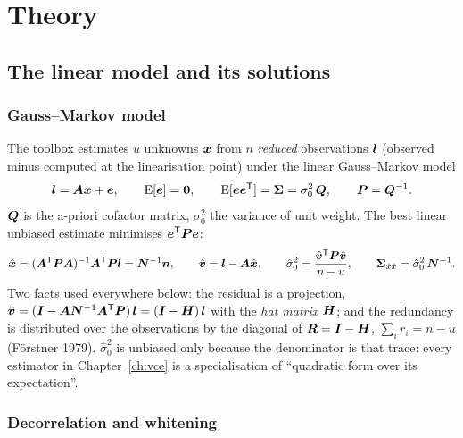 \part{Theory}

\chapter{The linear model and its solutions}
\label{ch:model}

\section{Gauss--Markov model}

The toolbox estimates $u$ unknowns $\bm{x}$ from $n$ \emph{reduced} observations $\bm{l}$ (observed minus computed at the linearisation point) under the linear Gauss--Markov model
\begin{equation}
\bm{l} = \bm{A}\bm{x} + \bm{e}, \qquad \operatorname{E}[\bm{e}] = \bm{0}, \qquad \operatorname{E}[\bm{e}\bm{e}^{\mathsf T}] = \bm{\Sigma} = \sigma_0^2\,\bm{Q}, \qquad \bm{P} = \bm{Q}^{-1}.
\label{eq:gm}
\end{equation}
$\bm{Q}$ is the a-priori cofactor matrix, $\sigma_0^2$ the variance of unit weight. The best linear unbiased estimate minimises $\bm{e}^{\mathsf T}\bm{P}\bm{e}$:
\begin{equation}
\hat{\bm{x}} = (\bm{A}^{\mathsf T}\bm{P}\bm{A})^{-1}\bm{A}^{\mathsf T}\bm{P}\bm{l} = \bm{N}^{-1}\bm{n}, \qquad
\hat{\bm{v}} = \bm{l} - \bm{A}\hat{\bm{x}}, \qquad
\hat\sigma_0^2 = \frac{\hat{\bm{v}}^{\mathsf T}\bm{P}\hat{\bm{v}}}{n-u}, \qquad
\bm{\Sigma}_{\hat x\hat x} = \hat\sigma_0^2\,\bm{N}^{-1}.
\label{eq:lsq}
\end{equation}
Two facts used everywhere below: the residual is a projection, $\hat{\bm{v}} = (\bm{I}-\bm{A}\bm{N}^{-1}\bm{A}^{\mathsf T}\bm{P})\,\bm{l} = (\bm{I}-\bm{H})\,\bm{l}$ with the \emph{hat matrix} $\bm{H}$; and the redundancy is distributed over the observations by the diagonal of $\bm{R} = \bm{I}-\bm{H}$, $\sum_i r_i = n-u$ (Förstner 1979). $\hat\sigma_0^2$ is unbiased only because the denominator is that trace: every estimator in Chapter~\ref{ch:vce} is a specialisation of ``quadratic form over its expectation''.

\section{Decorrelation and whitening}

